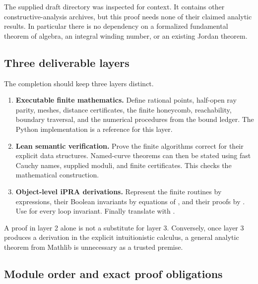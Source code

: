 The supplied draft directory was inspected for context. It contains
other constructive-analysis archives, but this proof needs none
of their claimed analytic results. In particular there is no
dependency on a formalized fundamental theorem of algebra,
an integral winding number, or an existing Jordan theorem.

\subsection{Three deliverable layers}

The completion should keep three layers distinct.

\begin{enumerate}
\item \textbf{Executable finite mathematics.}
Define rational points, half-open ray parity, meshes, distance
certificates, the finite honeycomb, reachability, boundary
traversal, and the numerical procedures from the bound ledger.
The Python implementation is a reference for this layer.
\item \textbf{Lean semantic verification.}
Prove the finite algorithms correct for their explicit data
structures. Named-curve theorems can then be stated using
fast Cauchy names, supplied moduli, and finite certificates.
This checks the mathematical construction.
\item \textbf{Object-level iPRA derivations.}
Represent the finite routines by  expressions,
their Boolean invariants by equations of , and
their proofs by . Use 
for every loop invariant. Finally translate with
.
\end{enumerate}

A proof in layer 2 alone is not a substitute for layer 3.
Conversely, once layer 3 produces a derivation in the explicit
intuitionistic calculus, a general analytic theorem from Mathlib
is unnecessary as a trusted premise.

\subsection{Module order and exact proof obligations}

